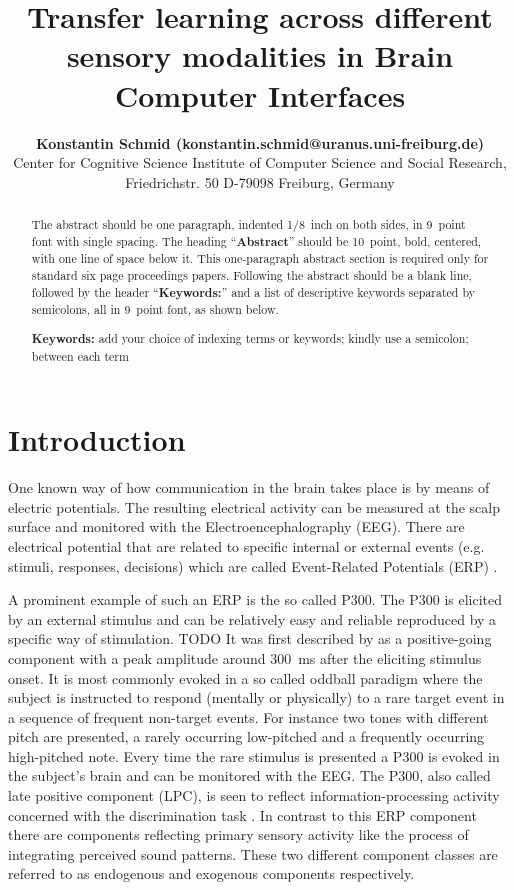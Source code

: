 \documentclass[10pt,letterpaper]{article}
\title{Transfer learning across different sensory modalities in Brain Computer Interfaces}
\author{{\large \bf Konstantin Schmid (konstantin.schmid@uranus.uni-freiburg.de)} \\
	  Center for Cognitive Science Institute of Computer Science and Social Research,\\
	  Friedrichstr. 50 D-79098 Freiburg, Germany\\}
\begin{document}
\maketitle


\begin{abstract}
The abstract should be one paragraph, indented 1/8~inch on both sides,
in 9~point font with single spacing. The heading ``{\bf Abstract}''
should be 10~point, bold, centered, with one line of space below
it. This one-paragraph abstract section is required only for standard
six page proceedings papers. Following the abstract should be a blank
line, followed by the header ``{\bf Keywords:}'' and a list of
descriptive keywords separated by semicolons, all in 9~point font, as
shown below.

\textbf{Keywords:} 
add your choice of indexing terms or keywords; kindly use a
semicolon; between each term
\end{abstract}

\section{Introduction}
One known way of how communication in the brain takes place is by means of electric potentials.
The resulting electrical activity can be measured at the scalp surface and monitored with the Electroencephalography (EEG).
There are electrical potential that are related to specific internal or external events (e.g. stimuli, responses, decisions) which are called Event-Related Potentials (ERP) \cite{Luck_2014}.

A prominent example of such an ERP is the so called P300.
The P300 is elicited by an external stimulus and can be relatively easy and reliable reproduced by a specific way of stimulation. TODO %
It was first described by  as a positive-going component with a peak amplitude around 300~ms after the eliciting stimulus onset.
It is most commonly evoked in a so called oddball paradigm where the subject is instructed to respond (mentally or physically) to a rare target event in a sequence of frequent non-target events.
For instance two tones with different pitch are presented, a rarely occurring low-pitched and a frequently occurring high-pitched note.
Every time the rare stimulus is presented a P300 is evoked in the subject's brain and can be monitored with the EEG.
The P300, also called late positive component (LPC), is seen to reflect information-processing activity concerned with the discrimination task \cite{Wolpaw_2012}.
In contrast to this ERP component there are components reflecting primary sensory activity like the process of integrating perceived sound patterns.
These two different component classes are referred to as endogenous and exogenous components respectively.
\end{document}
